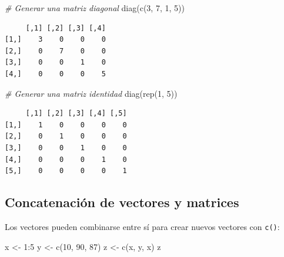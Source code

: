 \documentclass[
]{book}
\newenvironment{Shaded}{\begin{snugshade}}{\end{snugshade}}
\newcommand{\CommentTok}[1]{\textcolor[rgb]{0.56,0.35,0.01}{\textit{#1}}}
\newcommand{\DecValTok}[1]{\textcolor[rgb]{0.00,0.00,0.81}{#1}}
\newcommand{\FunctionTok}[1]{\textcolor[rgb]{0.00,0.00,0.00}{#1}}
\newcommand{\NormalTok}[1]{#1}
\newcommand{\OtherTok}[1]{\textcolor[rgb]{0.56,0.35,0.01}{#1}}
\newcommand{\SpecialCharTok}[1]{\textcolor[rgb]{0.00,0.00,0.00}{#1}}
\begin{document}
\begin{Shaded}
\begin{Highlighting}[]
\CommentTok{\# Generar una matriz diagonal}
\FunctionTok{diag}\NormalTok{(}\FunctionTok{c}\NormalTok{(}\DecValTok{3}\NormalTok{, }\DecValTok{7}\NormalTok{, }\DecValTok{1}\NormalTok{, }\DecValTok{5}\NormalTok{))}
\end{Highlighting}
\end{Shaded}

\begin{verbatim}
     [,1] [,2] [,3] [,4]
[1,]    3    0    0    0
[2,]    0    7    0    0
[3,]    0    0    1    0
[4,]    0    0    0    5
\end{verbatim}

\begin{Shaded}
\begin{Highlighting}[]
\CommentTok{\# Generar una matriz identidad}
\FunctionTok{diag}\NormalTok{(}\FunctionTok{rep}\NormalTok{(}\DecValTok{1}\NormalTok{, }\DecValTok{5}\NormalTok{))}
\end{Highlighting}
\end{Shaded}

\begin{verbatim}
     [,1] [,2] [,3] [,4] [,5]
[1,]    1    0    0    0    0
[2,]    0    1    0    0    0
[3,]    0    0    1    0    0
[4,]    0    0    0    1    0
[5,]    0    0    0    0    1
\end{verbatim}

\hypertarget{concatenaciuxf3n-de-vectores-y-matrices}{%
\subsection{Concatenación de vectores y matrices}\label{concatenaciuxf3n-de-vectores-y-matrices}}

Los vectores pueden combinarse entre sí para crear nuevos vectores con \texttt{c()}:

\begin{Shaded}
\begin{Highlighting}[]
\NormalTok{x }\OtherTok{\textless{}{-}} \DecValTok{1}\SpecialCharTok{:}\DecValTok{5}
\NormalTok{y }\OtherTok{\textless{}{-}} \FunctionTok{c}\NormalTok{(}\DecValTok{10}\NormalTok{, }\DecValTok{90}\NormalTok{, }\DecValTok{87}\NormalTok{)}
\NormalTok{z }\OtherTok{\textless{}{-}} \FunctionTok{c}\NormalTok{(x, y, x)}
\NormalTok{z}
\end{Highlighting}
\end{Shaded}
\end{document}
